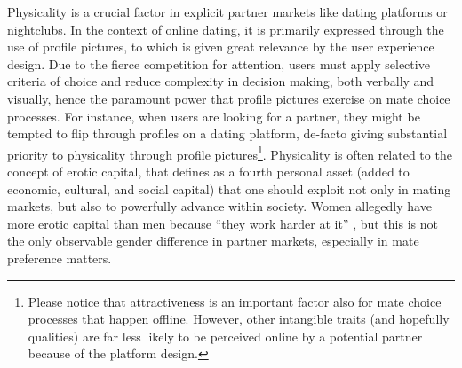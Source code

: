 Physicality is a crucial factor in explicit partner markets like dating
platforms or nightclubs. In the context of online dating, it is primarily
expressed through the use of profile pictures, to which is given great
relevance by the user experience design. Due to the fierce competition
for attention, users must apply selective criteria of choice and reduce
complexity in decision making, both verbally and visually, hence the
paramount power that profile pictures exercise on mate choice processes.
For instance, when users are looking for a partner, they might be
tempted to flip through profiles on a dating platform, de-facto giving
substantial priority to physicality through profile pictures\footnote{Please notice that attractiveness is an important factor also for
mate choice processes that happen offline. However, other intangible
traits (and hopefully qualities) are far less likely to be perceived
online by a potential partner because of the platform design.}. Physicality is often related to the concept of erotic capital, that
\citet{Hakim2011Erotic-Capital} defines as a fourth personal asset
(added to economic, cultural, and social capital) that one should
exploit not only in mating markets, but also to powerfully advance
within society. Women allegedly have more erotic capital than men
because \textquotedblleft they work harder at it\textquotedblright{}
\citep{Hakim2010Erotic-Capital}, but this is not the only observable
gender difference in partner markets, especially in mate preference
matters.

